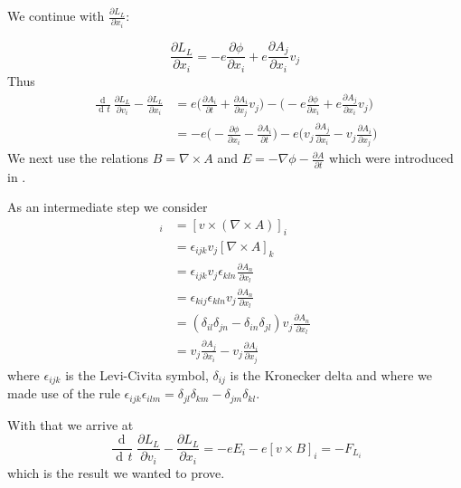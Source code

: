\documentclass{article}
\DeclareMathOperator{\dd}{d\!}
\begin{document}
We continue with $\frac{\partial L_L}{\partial x_i}$:

\begin{equation}
    \frac{\partial L_L}{\partial x_i} = -e \frac{\partial \phi}{\partial x_i} + e \frac{\partial A_j}{\partial x_i} v_j
\end{equation}
Thus
\begin{align}
    \frac{\dd}{\dd t} \frac{\partial L_L}{\partial v_i} - \frac{\partial L_L}{\partial x_i}
    & = e \bigg(\frac{\partial A_i}{\partial t} + \frac{\partial A_i}{\partial x_j} v_j\bigg)
    - \bigg( -e \frac{\partial \phi}{\partial x_i} + e \frac{\partial A_j}{\partial x_i} v_j \bigg) \nonumber \\
    & = - e \bigg( -\frac{\partial \phi}{\partial x_i} - \frac{\partial A_i}{\partial t} \bigg)
    - e \bigg( v_j \frac{\partial A_j}{\partial x_i}  - v_j \frac{\partial A_i}{\partial x_j}  \bigg)
\end{align}
We next use the relations $B = \nabla \times A$ and $E = - \nabla \phi - \frac{\partial A}{\partial t}$ which were introduced in  \cite{LagrangeOfField}.

As an intermediate step we consider
\begin{align}
[v \times B]_i &= [v \times (\nabla \times A)]_i \nonumber \\
&=\epsilon_{ijk} v_j [\nabla \times A]_k \nonumber \\
&=\epsilon_{ijk} v_j \epsilon_{kln} \frac{\partial A_n}{\partial x_l} \nonumber \\
&=\epsilon_{kij} \epsilon_{kln} v_j  \frac{\partial A_n}{\partial x_l} \nonumber \\
&=(\delta_{il} \delta_{jn} - \delta_{in} \delta_{jl} ) v_j  \frac{\partial A_n}{\partial x_l} \nonumber \\
&=v_j \frac{\partial A_j}{\partial x_i} - v_j \frac{\partial A_i}{\partial x_j} \nonumber
\end{align}
where $\epsilon_{ijk}$ is the Levi-Civita symbol, $\delta_{ij}$ is the Kronecker delta and where we made use of the rule
$\epsilon_{ijk} \epsilon_{ilm} = \delta_{jl}\delta_{km} - \delta_{jm}\delta_{kl}$.

With that we arrive at
\begin{equation}
    \frac{\dd}{\dd t} \frac{\partial L_L}{\partial v_i} - \frac{\partial L_L}{\partial x_i}
    = - e E_i - e [v \times B]_i = -F_L_i
\end{equation}
which is the result we wanted to prove.
\end{document}
